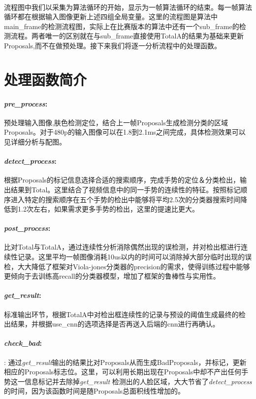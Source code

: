 \documentclass{article}
\begin{document}
\paragraph{}流程图中我们以采集为算法循环的开始，显示为一帧算法循环的结束。每一帧算法循环都在根据输入图像更新上述四组全局变量。这里的流程图是算法中main\_frame的检测流程图，实际上在比赛版本的算法中还有一个sub\_frame的检测流程。两者唯一的区别就在与sub\_frame直接使用TotalA的结果为基础来更新Proposals,而不在做预处理。接下来我们将逐一分析流程中的处理函数。

\section{处理函数简介}
	
\paragraph{\emph{pre\_process}:} 预处理输入图像,肤色检测定位，结合上一帧Proposals生成检测分类的区域Proposals。对于480p的输入图像可以在1.8到2.1ms之间完成，具体检测效果可以见详细分析与配图。
\paragraph{\emph{detect\_process}:} 根据Proposals的标记信息选择合适的搜索顺序，完成手势的定位＆分类检出，输出结果到Total。这里结合了视频信息中的同一手势的连续性的特征。按照标记顺序进入特定的搜索顺序在五个手势的检出中能够将平均2.5次的分类器搜索时间降低到1.2次左右，如果需求更多手势的检出，这里的提速比更大。
\paragraph{\emph{post\_process}:} 比对Total与TotalA，通过连续性分析消除偶然出现的误检测，并对检出框进行连续性记录。这里平均一帧图像消耗10us以内的时间可以消除掉大部分临时出现的误检，大大降低了框架对Viola-jones分类器的precision的需求，使得训练过程中能够更倾向于去训练高recall的分类器模型，增加了框架的鲁棒性与实用性。
\paragraph{\emph{get\_result}:} 标准输出环节，根据TotalA中对检出框连续性的记录与预设的阈值生成最终的检出结果，并根据use\_cnn的选项选择是否再送入后端的cnn进行再确认。
\paragraph{\emph{check\_bad}:}: 通过\emph{get\_result}输出的结果比对Proposals从而生成BadProposals，并标记，更新相应的Proposals标志位。这里，可以利用长期出现在Proposals中却不产出任何手势这一信息标记并去除掉\emph{get\_result} 检测出的人脸区域，大大节省了\emph{detect\_process}的时间，因为该函数时间是随Proposals总面积线性增加的。
\end{document}
